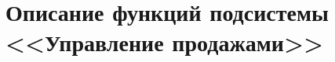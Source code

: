 \section{Описание функций подсистемы <<Управление продажами>>}



% 


% 








%
%
%
%
%
%
%
%






%  